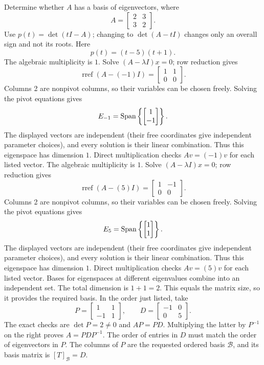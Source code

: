\goal Determine whether $A$ has a basis of eigenvectors, where
\[A=\begin{bmatrix}2&3\\3&2\end{bmatrix}.\]
Use $p(t)=\det(tI-A)$; changing to $\det(A-tI)$ changes only an overall sign and not its roots. Here
\[p(t)=\left(t - 5\right) \left(t + 1\right).\]
The algebraic multiplicity is $1$. Solve $(A-\lambda I)x=0$; row reduction gives
\[\operatorname{rref}(A-(-1)I)=\begin{bmatrix}1&1\\0&0\end{bmatrix}.\]
Columns 2 are nonpivot columns, so their variables can be chosen freely. Solving the pivot equations gives
\[E_{-1}=\operatorname{Span}\left\{\begin{bmatrix}1\\-1\end{bmatrix}\right\}.\]
The displayed vectors are independent (their free coordinates give independent parameter choices), and every solution is their linear combination. Thus this eigenspace has dimension $1$. Direct multiplication checks $Av=(-1)v$ for each listed vector.
The algebraic multiplicity is $1$. Solve $(A-\lambda I)x=0$; row reduction gives
\[\operatorname{rref}(A-(5)I)=\begin{bmatrix}1&-1\\0&0\end{bmatrix}.\]
Columns 2 are nonpivot columns, so their variables can be chosen freely. Solving the pivot equations gives
\[E_{5}=\operatorname{Span}\left\{\begin{bmatrix}1\\1\end{bmatrix}\right\}.\]
The displayed vectors are independent (their free coordinates give independent parameter choices), and every solution is their linear combination. Thus this eigenspace has dimension $1$. Direct multiplication checks $Av=(5)v$ for each listed vector.
Bases for eigenspaces at different eigenvalues combine into an independent set. The total dimension is $1+1=2$.
This equals the matrix size, so it provides the required basis. In the order just listed, take
\[P=\begin{bmatrix}1&1\\-1&1\end{bmatrix},\qquad D=\begin{bmatrix}-1&0\\0&5\end{bmatrix}.\]
The exact checks are $\det P=2\ne0$ and $AP=PD$. Multiplying the latter by $P^{-1}$ on the right proves $A=PDP^{-1}$. The order of entries in $D$ must match the order of eigenvectors in $P$.
The columns of $P$ are the requested ordered basis $\mathcal B$, and its basis matrix is $[T]_{\mathcal B}=D$.

